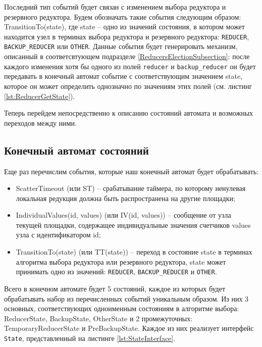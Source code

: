 \documentclass{article}
\theoremstyle{plain}
\theoremstyle{plain}
\theoremstyle{plain}
\theoremstyle{plain}
\theoremstyle{definition}
\theoremstyle{remark}
\theoremstyle{plain}
\begin{document}
Последний тип событий будет связан с изменением выбора редуктора и резервного редуктора. Будем обозначать такие события следующим образом: TransitionTo(state), где state -- одно из значений состояния, в котором может находится узел в терминах выбора редуктора и резервного редуктора: \texttt{REDUCER}, \texttt{BACKUP\_REDUCER} или \texttt{OTHER}. Данные события будет генерировать механизм, описанный в соответсвтующем подразделе \ref{ReducersElectionSubsection}: после каждого изменения хотя бы одного из полей \texttt{reducer} и \texttt{backup\_reducer} он будет передавать в конечный автомат событие с соответствующим значением state, которое он может определить однозначно по значениям этих полей (см. листинг \ref{lst:ReducerGetState}).

Теперь перейдем непосредственно к описанию состояний автомата и возможных переходов между ними.

\subsection{Конечный автомат состояний}
\label{StateMachineSubsection}

Еще раз перечислим события, которые наш конечный автомат будет обрабатывать:

\begin{itemize}
    \item ScatterTimeout (или ST) -- срабатывание таймера, по которому ненулевая локальная редукция должна быть распространена на другие площадки;
    
    \item IndividualValues(id, values) (или IV(id, values)) -- сообщение от узла текущей площадки, содержащее индивидуальные значения счетчиков values узла с идентификатором id;
    
    \item TransitionTo(state) (или TT(state)) -- переход в состояние state в терминах алгоритма выбора редуктора или резервного редуктора, state может принимать одно из значений: \texttt{REDUCER}, \texttt{BACKUP\_REDUCER} и \texttt{OTHER}.
\end{itemize}

Всего в конечном автомате будет 5 состояний, каждое из которых будет обрабатывать набор из перечисленных событий уникальным образом. Из них 3 основных, соответствующих одноименным состояниям в алгоритме выбора: ReducerState, BackupState, OtherState и 2 промежуточных: TemporaryReducerState и PreBackupState. Каждое из них реализует интерфейс \texttt{State}, представленный на листинге \ref{lst:StateInterface}.
\end{document}
